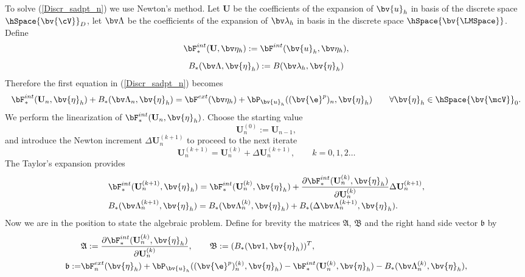 To solve (\ref{Discr_sadpt_n}) we use Newton's method. Let $\mathbf{U}$ be the coefficients of the expansion of $\bv{u}_{h}$ in basis of the discrete space $\hSpace{\bv{\cV}}_D$, let $\bv \Lambda$ be the coefficients of the expansion of $\bv \lambda_h$ in basis in the discrete space $\hSpace{\bv{\LMSpace}}$. Define
\begin{equation*}
\begin{array}{c}
\bF^{int}_*(\mathbf{U},\bv\eta_h) := \bF^{int}(\bv{u}_{h},\bv\eta_h), \\[2ex]
B_*(\bv \Lambda, \bv{\eta}_h) := B(\bv \lambda_h, \bv{\eta}_h) 
\end{array}
\end{equation*}
Therefore the first equation in (\ref{Discr_sadpt_n}) becomes
\begin{equation*} \label{Discr_sadpt_nFirstEq}
  \bF^{int}_*(\mathbf{U}_n,\bv{\eta}_h) 
+ B_*(\bv \Lambda_n, \bv{\eta}_h) 
= \bF^{ext}(\bv\eta_h)
+ \bP_{\bv{u}_{h}} ( (\bv{\e}^p)_n,\bv{\eta}_h) 
\qquad \forall \bv{\eta}_h \in \hSpace{\bv{\mcV}}_0.
\end{equation*}
We perform the linearization of $\bF^{int}_*(\mathbf{U}_{n} ,\bv{\eta}_h)$. Choose the starting value 
\[
\mathbf{U}^{(0)}_{n} := \mathbf{U}_{n-1},
\]
and introduce the Newton increment $\Delta \mathbf{U}^{(k+1)}_{n}$ to proceed to the next iterate 
\[
\mathbf{U}^{(k+1)}_{n} = \mathbf{U}^{(k)}_{n} + \Delta \mathbf{U}^{(k+1)}_{n}, \qquad k=0,1,2 \dots
\]
The Taylor's expansion provides
\begin{equation*} 
\begin{array}{l}
\bF^{int}_*(\mathbf{U}^{(k+1)}_{n} ,\bv{\eta}_h) 
= \bF^{int}_*(\mathbf{U}^{(k)}_{n} ,\bv{\eta}_h) 
+ \dfrac{\partial \bF^{int}_* (\mathbf{U}^{(k)}_{n} ,\bv{\eta}_h)}{\partial \mathbf{U}^{(k)}_{n}} \Delta \mathbf{U}^{(k+1)}_{n}, \\[2ex]
B_*(\bv \Lambda^{(k+1)}_n, \bv{\eta}_h) 
= B_*(\bv \Lambda^{(k)}_n, \bv{\eta}_h)
+ B_*( \Delta \bv \Lambda^{(k+1)}_n, \bv{\eta}_h).
\end{array}
\end{equation*}
Now we are in the position to state the algebraic problem. Define for brevity the matrices $\mathfrak A$, $\mathfrak B$ and the right hand side vector $\mathfrak b$ by
\begin{align*}
&\mathfrak  A := \dfrac{\partial \bF^{int}_* (\mathbf{U}^{(k)}_{n} ,\bv{\eta}_h)}{\partial \mathbf{U}^{(k)}_{n}}, 
\qquad  \mathfrak  B := (B_*( \bv 1, \bv{\eta}_h))^T,\\
\mathfrak b := & \bF^{ext}_{n}(\bv{\eta}_h)
+ \bP_{\bv{u}_{h}} ( (\bv{\e}^p)^{(k)}_{n},\bv{\eta}_h) 
- \bF^{int}_*(\mathbf{U}^{(k)}_{n}, \bv{\eta}_h) 
- B_*(\bv \Lambda^{(k)}_n, \bv{\eta}_h), 
\end{align*}

